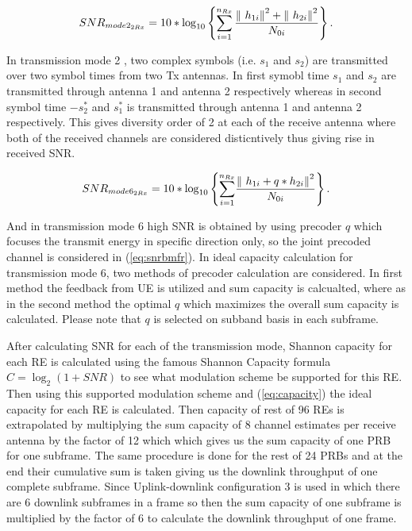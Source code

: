\documentclass[a4paper,10pt]{article}
\begin{document}
\begin{equation} \label{eq:snralam}
SNR_{mode2_{2Rx}} = 10* {\mathrm{log}}_{10} \left\lbrace {\sum_{i=1}^{n_{Rx}}} \, {\frac{ {\| \ {h_{1i}} \| \\}^2 +  {\| \ {h_{2i}} \| \\}^2 }{N_{0i}}}\right\rbrace. 
\end{equation}

In transmission mode 2 , two complex symbols (i.e. $s_1$ and $s_2$) are transmitted over two symbol times from two Tx antennas. In first symobl time $s_1$ and $s_2$ are transmitted through antenna 1 and antenna 2 respectively whereas in second symbol time $-{s_{2}^{*}}$ and ${s_{1}^{*}}$ is transmitted through antenna 1 and antenna 2 respectively. This gives diversity order of 2 at each of the receive antenna where both of the received channels are considered disticntively thus giving rise in received SNR. 

\begin{equation} \label{eq:snrbmfr}
SNR_{mode6_{2Rx}} = 10* {\mathrm{log}}_{10} \left\lbrace {\sum_{i=1}^{n_{Rx}}} {\frac{{\| \ {h_{1i}} + q*{h_{2i}} \| \\}^2}{N_{0i}}}\right\rbrace. 
\end{equation}

And in transmission mode 6 high SNR is obtained by using precoder $q$ which focuses the transmit energy in specific direction only, so the joint precoded channel is considered in (\ref{eq:snrbmfr}). In ideal capacity calculation for transmission mode 6, two methods of precoder calculation are considered. In first method the feedback from UE is utilized and sum capacity is calcualted, where as in the second method the optimal $q$ which maximizes the overall sum capacity is calculated. Please note that $q$ is selected on subband basis in each subframe.


After calculating SNR for each of the transmission mode, Shannon capacity for each RE is calculated using the famous Shannon Capacity formula $C = \log_2(1 + SNR)$ to see what modulation scheme be supported for this RE. Then using this supported modulation scheme and (\ref{eq:capacity}) the ideal capacity for each RE is calculated.
\newline
Then capacity of rest of 96 REs is extrapolated by multiplying the sum capacity of 8 channel estimates per receive antenna by the factor of 12 which which gives us the sum capacity of one PRB for one subframe. The same procedure is done for the rest of 24 PRBs and at the end their cumulative sum is taken giving us the downlink throughput of one complete subframe. Since Uplink-downlink configuration 3 is used in which there are 6 downlink subframes in a frame so then the sum capacity of one subframe is multiplied by the factor of 6 to calculate the downlink throughput of one frame. 
\end{document}
